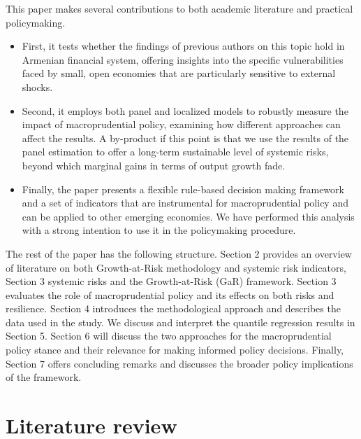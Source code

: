 \documentclass[12pt,a4paper]{article}
\begin{document}
This paper makes several contributions to both academic literature and practical policymaking. 

\begin{itemize}
    \item First, it tests whether the findings of previous authors on this topic hold in Armenian financial system, offering insights into the specific vulnerabilities faced by small, open economies that are particularly sensitive to external shocks.
    \item Second, it employs both panel and localized models to robustly measure the impact of macroprudential policy, examining how different approaches can affect the results. A by-product if this point is that we use the results of the panel estimation to offer a long-term sustainable level of systemic risks, beyond which marginal gains in terms of output growth fade.
    \item Finally, the paper presents a flexible rule-based decision making framework and a set of indicators that are instrumental for macroprudential policy and can be applied to other emerging economies. We have performed this analysis with a strong intention to use it in the policymaking procedure.
\end{itemize}

The rest of the paper has the following structure. Section 2 provides an overview of literature on both Growth-at-Risk methodology and systemic risk indicators, Section 3 systemic risks and the Growth-at-Risk (GaR) framework. Section 3 evaluates the role of macroprudential policy and its effects on both risks and resilience. Section 4 introduces the methodological approach and describes the data used in the study. We discuss and interpret the quantile regression results in Section 5. Section 6 will discuss the two approaches for the macroprudential policy stance and their relevance for making informed policy decisions. Finally, Section 7 offers concluding remarks and discusses the broader policy implications of the framework.

\section{Literature review}
\end{document}
